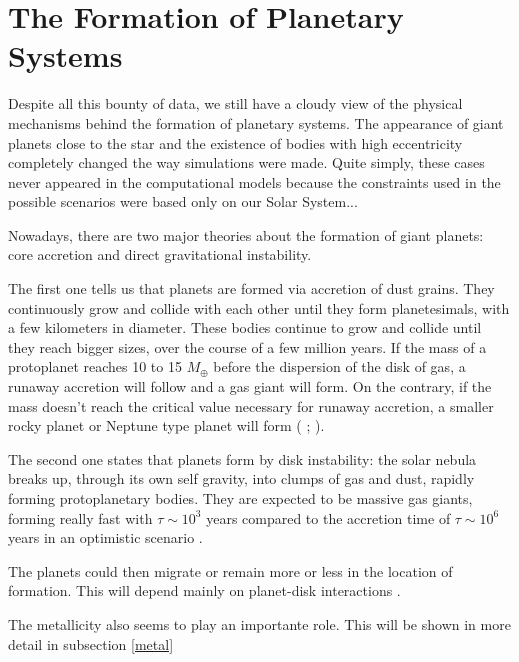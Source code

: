 \documentclass[dvips,12pt,a4paper]{report}
\begin{document}
\section {The Formation of Planetary Systems}
\label {planets}
\indent Despite all this bounty of data, we still have a cloudy view of the physical mechanisms behind the formation of planetary systems. The appearance of giant planets close to the star and the existence of bodies with high eccentricity completely changed the way simulations were made. Quite simply, these cases never appeared in the computational models because the constraints used in the possible scenarios were based only on our Solar System...

Nowadays, there are two major theories about the formation of giant planets: core accretion and direct gravitational instability. 

The first one tells us that planets are formed via accretion of dust grains. They continuously grow and collide with each other until they form planetesimals, with a few kilometers in diameter. These bodies continue to grow and collide until they reach bigger sizes, over the course of a few million years. If the mass of a protoplanet reaches 10 to 15 $M_{\oplus}$ before the dispersion of the disk of gas, a runaway accretion will follow and a gas giant will form. On the contrary, if the mass doesn't reach the critical value necessary for runaway accretion, a smaller rocky planet or Neptune type planet will form (\citeauthor{Pollack-1996} \citeyear{Pollack-1996}; \citeauthor{Alibert-2006} \citeyear{Alibert-2006}). 

The second one states that planets form by disk instability: the solar nebula breaks up, through its own self gravity, into clumps of gas and dust, rapidly forming protoplanetary bodies. They are expected to be massive gas giants, forming really fast with  $\tau\sim10^3$ years compared to the accretion time of $\tau\sim10^6$ years in an optimistic scenario \citep{Boss-1997}. 

The planets could then migrate or remain more or less in the location of formation. This will depend mainly on planet-disk interactions \citep{Trilling-1998}.

The metallicity also seems to play an importante role. This will be shown in more detail in subsection \ref{metal}

\end{document}
